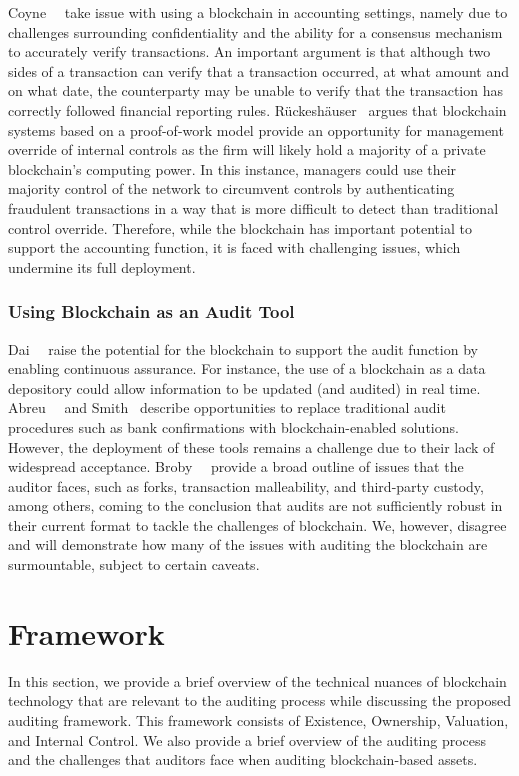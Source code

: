 Coyne~\etal~\cite{coyne2017can} take issue with using a blockchain in accounting settings, namely due to challenges surrounding confidentiality and the ability for a consensus mechanism to accurately verify transactions. An important argument is that although two sides of a transaction can verify that a transaction occurred, at what amount and on what date, the counterparty may be unable to verify that the transaction has correctly followed financial reporting rules. Rückeshäuser~\cite{ruckeshauser2017we} argues that blockchain systems based on a proof-of-work model provide an opportunity for management override of internal controls as the firm will likely hold a majority of a private blockchain's computing power. In this instance, managers could use their majority control of the network to circumvent controls by authenticating fraudulent transactions in a way that is more difficult to detect than traditional control override. Therefore, while the blockchain has important potential to support the accounting function, it is faced with challenging issues, which undermine its full deployment.

\subsubsection{Using Blockchain as an Audit Tool}
Dai~\etal~\cite{dai2017toward} raise the potential for the blockchain to support the audit function by enabling continuous assurance. For instance, the use of a blockchain as a data depository could allow information to be updated (and audited) in real time. Abreu~\etal~\cite{abreu2018blockchain} and Smith~\cite{cgma2018blockchain} describe opportunities to replace traditional audit procedures such as bank confirmations with blockchain-enabled solutions. However, the deployment of these tools remains a challenge due to their lack of widespread acceptance. Broby~\etal~\cite{broby2017financial} provide a broad outline of issues that the auditor faces, such as forks, transaction malleability, and third-party custody, among others, coming to the conclusion that audits are not sufficiently robust in their current format to tackle the challenges of blockchain. We, however, disagree and will demonstrate how many of the issues with auditing the blockchain are surmountable, subject to certain caveats.

\section{Framework} \label{sec:auditing:framework} 
In this section, we provide a brief overview of the technical nuances of blockchain technology that are relevant to the auditing process while discussing the proposed auditing framework. This framework consists of Existence, Ownership, Valuation, and Internal Control. We also provide a brief overview of the auditing process and the challenges that auditors face when auditing blockchain-based assets.


